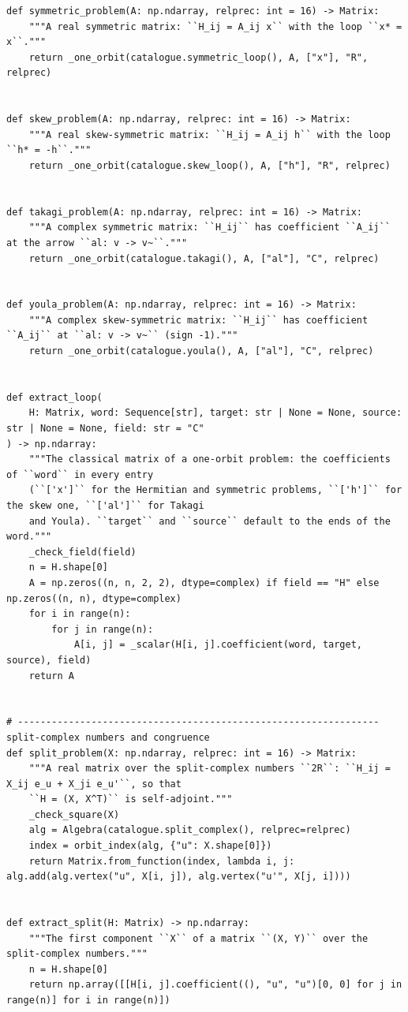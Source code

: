 \documentclass[12pt, a4paper]{report}
\theoremstyle{plain}
\theoremstyle{definition}
\theoremstyle{remark}
\theoremstyle{plain}
\begin{document}
\begin{lstlisting}[style=dsqcode]
def symmetric_problem(A: np.ndarray, relprec: int = 16) -> Matrix:
    """A real symmetric matrix: ``H_ij = A_ij x`` with the loop ``x* = x``."""
    return _one_orbit(catalogue.symmetric_loop(), A, ["x"], "R", relprec)


def skew_problem(A: np.ndarray, relprec: int = 16) -> Matrix:
    """A real skew-symmetric matrix: ``H_ij = A_ij h`` with the loop ``h* = -h``."""
    return _one_orbit(catalogue.skew_loop(), A, ["h"], "R", relprec)


def takagi_problem(A: np.ndarray, relprec: int = 16) -> Matrix:
    """A complex symmetric matrix: ``H_ij`` has coefficient ``A_ij`` at the arrow ``al: v -> v~``."""
    return _one_orbit(catalogue.takagi(), A, ["al"], "C", relprec)


def youla_problem(A: np.ndarray, relprec: int = 16) -> Matrix:
    """A complex skew-symmetric matrix: ``H_ij`` has coefficient ``A_ij`` at ``al: v -> v~`` (sign -1)."""
    return _one_orbit(catalogue.youla(), A, ["al"], "C", relprec)


def extract_loop(
    H: Matrix, word: Sequence[str], target: str | None = None, source: str | None = None, field: str = "C"
) -> np.ndarray:
    """The classical matrix of a one-orbit problem: the coefficients of ``word`` in every entry
    (``['x']`` for the Hermitian and symmetric problems, ``['h']`` for the skew one, ``['al']`` for Takagi
    and Youla). ``target`` and ``source`` default to the ends of the word."""
    _check_field(field)
    n = H.shape[0]
    A = np.zeros((n, n, 2, 2), dtype=complex) if field == "H" else np.zeros((n, n), dtype=complex)
    for i in range(n):
        for j in range(n):
            A[i, j] = _scalar(H[i, j].coefficient(word, target, source), field)
    return A


# ---------------------------------------------------------------- split-complex numbers and congruence
def split_problem(X: np.ndarray, relprec: int = 16) -> Matrix:
    """A real matrix over the split-complex numbers ``2R``: ``H_ij = X_ij e_u + X_ji e_u'``, so that
    ``H = (X, X^T)`` is self-adjoint."""
    _check_square(X)
    alg = Algebra(catalogue.split_complex(), relprec=relprec)
    index = orbit_index(alg, {"u": X.shape[0]})
    return Matrix.from_function(index, lambda i, j: alg.add(alg.vertex("u", X[i, j]), alg.vertex("u'", X[j, i])))


def extract_split(H: Matrix) -> np.ndarray:
    """The first component ``X`` of a matrix ``(X, Y)`` over the split-complex numbers."""
    n = H.shape[0]
    return np.array([[H[i, j].coefficient((), "u", "u")[0, 0] for j in range(n)] for i in range(n)])



\end{lstlisting}
\end{document}
